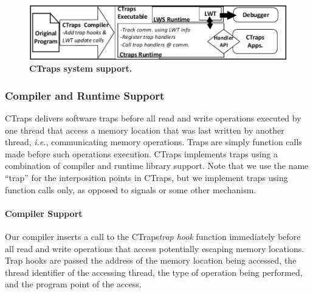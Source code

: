 \documentclass[preprint,9pt]{sigplanconf}
\newcommand{\ctraps}{CTraps\xspace}
\begin{document}
\begin{figure}[htb]
\centering
\includegraphics[width=.90\columnwidth]{figs/CTraps_Overview.pdf}
\caption{\label{fig:systemdiagram}{\bf CTraps system support.}}
\end{figure}



\subsubsection{Compiler and Runtime Support} 

\ctraps delivers software traps before all read and write operations executed
by one thread that access a memory location that was last written by another
thread, {\em i.e.}, communicating memory operations.  Traps are simply function
calls made before such operations execution.  \ctraps implements traps using a
combination of compiler and runtime library support.  Note that we use the name
``trap'' for the interposition points in \ctraps, but we implement traps using 
function calls only, as opposed to signals or some other mechanism. 

\paragraph{Compiler Support}
Our compiler inserts a call to the \ctraps {\em trap hook} function immediately
before all read and write operations that access potentially escaping memory
locations.  Trap hooks are passed the address of the memory location being
accessed, the thread identifier of the accessing thread, the type of operation
being performed, and the program point of the access.  
\end{document}

